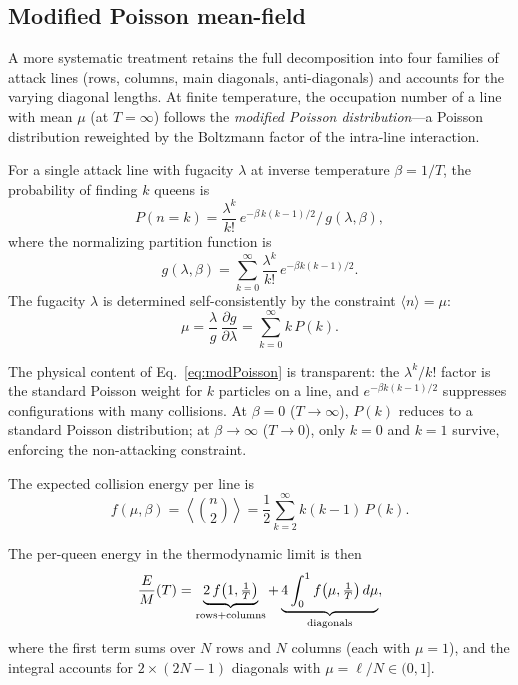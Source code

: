 \documentclass[aps, pre, reprint, amsmath, amssymb, superscriptaddress, floatfix]{revtex4-2}
\begin{document}
\subsection{Modified Poisson mean-field}

A more systematic treatment retains the full decomposition into
four families of attack lines (rows, columns, main diagonals,
anti-diagonals) and accounts for the varying diagonal lengths.
At finite temperature, the occupation number of a line with mean
$\mu$ (at $T = \infty$) follows the
\textit{modified Poisson distribution}---a Poisson distribution
reweighted by the Boltzmann factor of the intra-line interaction.

For a single attack line with fugacity $\lambda$ at inverse
temperature $\beta = 1/T$, the probability of finding $k$ queens is
\begin{equation}
  P(n = k) = \frac{\lambda^k}{k!}\,
  e^{-\beta\,k(k-1)/2}\Big/\,g(\lambda, \beta),
  \label{eq:modPoisson}
\end{equation}
where the normalizing partition function is
\begin{equation}
  g(\lambda, \beta) = \sum_{k=0}^\infty
  \frac{\lambda^k}{k!}\,e^{-\beta k(k-1)/2}.
  \label{eq:g_def}
\end{equation}
The fugacity $\lambda$ is determined self-consistently by the
constraint $\langle n \rangle = \mu$:
\begin{equation}
  \mu = \frac{\lambda}{g}\,\frac{\partial g}{\partial \lambda}
  = \sum_{k=0}^\infty k\,P(k).
  \label{eq:mu_constraint}
\end{equation}

The physical content of Eq.~\eqref{eq:modPoisson} is transparent:
the $\lambda^k/k!$ factor is the standard Poisson weight for $k$
particles on a line, and $e^{-\beta k(k-1)/2}$ suppresses
configurations with many collisions.  At $\beta = 0$ ($T \to \infty$),
$P(k)$ reduces to a standard Poisson distribution; at $\beta \to
\infty$ ($T \to 0$), only $k = 0$ and $k = 1$ survive, enforcing the
non-attacking constraint.

The expected collision energy per line is
\begin{equation}
  f(\mu, \beta) = \left\langle\binom{n}{2}\right\rangle
  = \frac{1}{2}\sum_{k=2}^{\infty} k(k-1)\,P(k).
  \label{eq:f_def}
\end{equation}

The per-queen energy in the thermodynamic limit is then
\begin{equation}
  \frac{E}{M}(T) = \underbrace{2\,f\!\left(1,\tfrac{1}{T}\right)
  }_{\rm rows + columns}
  + \underbrace{4\int_0^1 f\!\left(\mu,\tfrac{1}{T}\right)d\mu
  }_{\rm diagonals},
  \label{eq:E_MF}
\end{equation}
where the first term sums over $N$ rows and $N$ columns (each with
$\mu = 1$), and the integral accounts for $2 \times (2N-1)$ diagonals
with $\mu = \ell/N \in (0,1]$.
\end{document}
